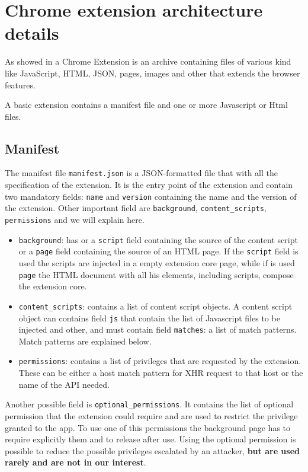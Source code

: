 \section{Chrome extension architecture details}
\label{sec:ExtDetails}
As showed in \cite{ChromeExtensionOnline} a Chrome Extension is an archive containing files of various kind like JavaScript, HTML, JSON, pages, images and other that extends the browser features.

A basic extension contains a manifest file and one or more Javascript or Html files.

\subsection{Manifest}
The manifest file \texttt{manifest.json} is a JSON-formatted file that with all the specification of the extension. It is the entry point of the extension and contain two mandatory fields: \texttt{name} and \texttt{version} containing the name and the version of the extension. Other important field are \texttt{background}, \texttt{content\_scripts}, \texttt{permissions} and we will explain here.
\begin{itemize}
\item \texttt{background}: has or a \texttt{script} field containing the source of the content script or a \texttt{page} field containing the source of an HTML page. If the \texttt{script} field is used the scripts are injected in a empty extension core page, while if is used \texttt{page} the HTML document with all his elements, including scripts, compose the extension core.
\item \texttt{content\_scripts}: contains a list of content script objects. A content script object can contains field \texttt{js} that contain the list of  Javascript files to be injected and other, and must contain field \texttt{matches}: a list of match patterns. Match patterns are explained below.
\item \texttt{permissions}: contains a list of privileges that are requested by the extension. These can be either a host match pattern for XHR request to that host or the name of the API needed.
\end{itemize}

Another possible field is \texttt{optional\_permissions}. It contains the list of optional permission that the extension could require and are used to restrict the privilege granted to the app. To use one of this permissions the background page has to require explicitly them and to release after use. Using the optional permission is possible to reduce the possible privileges escalated by an attacker, \textbf{but are used rarely and are not in our interest}.

